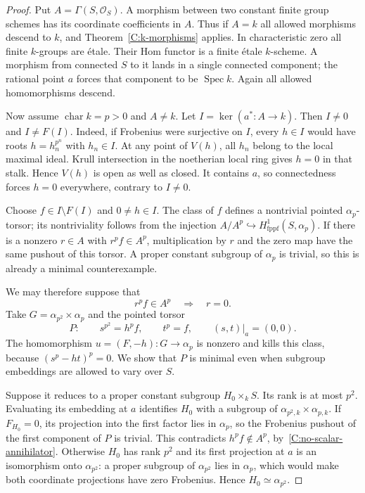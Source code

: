 \begin{proof}
Put $A=\Gamma(S,\mathcal O_S)$.  A morphism between two constant finite
group schemes has its coordinate coefficients in $A$.  Thus if $A=k$
all allowed morphisms descend to $k$, and
Theorem~\ref{C:k-morphisms} applies.  In characteristic zero all finite
$k$-groups are \'etale.  Their Hom functor is a finite \'etale
$k$-scheme.  A morphism from connected $S$ to it lands in a single
connected component; the rational point $a$ forces that component to
be $\operatorname{Spec}k$.  Again all allowed homomorphisms descend.

Now assume $\operatorname{char}k=p>0$ and $A\ne k$.  Let
$I=\ker(a^*\colon A\to k)$.  Then $I\ne0$ and $I\ne F(I)$.
Indeed, if Frobenius were surjective on $I$, every $h\in I$ would
have roots $h=h_n^{p^n}$ with $h_n\in I$.  At any point of $V(h)$,
all $h_n$ belong to the local maximal ideal.  Krull intersection in
the noetherian local ring gives $h=0$ in that stalk.  Hence $V(h)$
is open as well as closed.  It contains $a$, so connectedness forces
$h=0$ everywhere, contrary to $I\ne0$.

Choose $f\in I\setminus F(I)$ and $0\ne h\in I$.  The class of
$f$ defines a nontrivial pointed $\alpha_p$-torsor; its nontriviality
follows from the injection
$A/A^p\hookrightarrow H^1_{\mathrm{fppf}}(S,\alpha_p)$.
If there is a nonzero $r\in A$ with $r^pf\in A^p$, multiplication
by $r$ and the zero map have the same pushout of this torsor.  A
proper constant subgroup of $\alpha_p$ is trivial, so this is already
a minimal counterexample.

We may therefore suppose that
\begin{equation}
\label{C:no-scalar-annihilator}
r^pf\in A^p\quad\Longrightarrow\quad r=0.
\end{equation}
Take $G=\alpha_{p^2}\times\alpha_p$ and the pointed torsor
\[
P:\qquad s^{p^2}=h^pf,\qquad t^p=f,
\qquad (s,t)|_a=(0,0).
\]
The homomorphism $u=(F,-h)\colon G\to\alpha_p$ is nonzero and
kills this class, because $(s^p-ht)^p=0$.  We show that $P$ is minimal
even when subgroup embeddings are allowed to vary over $S$.

Suppose it reduces to a proper constant subgroup $H_0\times_k S$.
Its rank is at most $p^2$.  Evaluating its embedding at $a$ identifies
$H_0$ with a subgroup of $\alpha_{p^2,k}\times\alpha_{p,k}$.
If $F_{H_0}=0$, its projection into the first factor lies in
$\alpha_p$, so the Frobenius pushout of the first component of $P$
is trivial.  This contradicts
$h^pf\notin A^p$, by~\eqref{C:no-scalar-annihilator}.
Otherwise $H_0$ has rank $p^2$ and its first projection at $a$ is
an isomorphism onto $\alpha_{p^2}$: a proper subgroup of
$\alpha_{p^2}$ lies in $\alpha_p$, which would make both coordinate
projections have zero Frobenius.  Hence $H_0\simeq\alpha_{p^2}$.


\end{proof}

